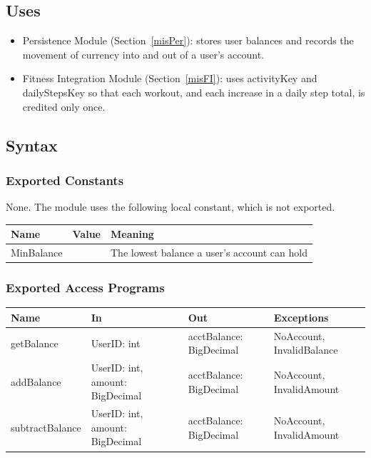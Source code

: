 \documentclass[12pt, titlepage]{article}
\begin{document}
\subsection{Uses}
\begin{itemize}
    \item Persistence Module (Section~\ref{misPer}): stores user balances and records the movement of currency into and out of a user's account.
    \item Fitness Integration Module (Section~\ref{misFI}): uses activityKey and dailyStepsKey so that each workout, and each increase in a daily step total, is credited only once.
\end{itemize}

\subsection{Syntax}

\subsubsection{Exported Constants}
None. The module uses the following local constant, which is not exported.\\

\noindent
\begin{tabularx}{\textwidth}{
  >{\raggedright\arraybackslash}p{3.4cm}
  >{\raggedright\arraybackslash}p{3cm}
  >{\raggedright\arraybackslash}X}
\toprule
\textbf{Name} & \textbf{Value} & \textbf{Meaning}\\
\midrule
MinBalance & 0 & The lowest balance a user's account can hold\\
\bottomrule
\end{tabularx}

\subsubsection{Exported Access Programs}

\begin{center}
\small
\renewcommand{\arraystretch}{1.2}
\begin{tabularx}{\textwidth}{
  >{\raggedright\arraybackslash}p{3.4cm}
  >{\raggedright\arraybackslash}X
  >{\raggedright\arraybackslash}p{3.6cm}
  >{\raggedright\arraybackslash}p{4.2cm}}
\hline
\textbf{Name} & \textbf{In} & \textbf{Out} & \textbf{Exceptions} \\
\hline
getBalance & UserID: int & acctBalance: BigDecimal & NoAccount, InvalidBalance \\
addBalance & UserID: int, amount: BigDecimal & acctBalance: BigDecimal & NoAccount, InvalidAmount \\ 
subtractBalance & UserID: int, amount: BigDecimal & acctBalance: BigDecimal & NoAccount, InvalidAmount \\
\hline
\end{tabularx}
\end{center}
\end{document}

